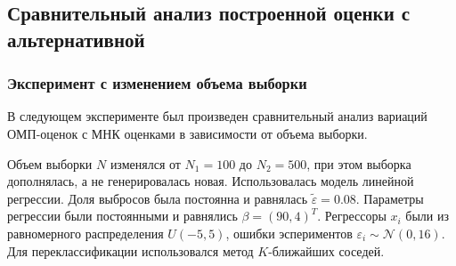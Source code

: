 
\subsection{Сравнительный анализ построенной оценки с альтернативной}
\subsubsection{Эксперимент с изменением объема выборки}
В следующем эксперименте был произведен сравнительный анализ вариаций ОМП-оценок с МНК оценками в зависимости от объема выборки.

Объем выборки $N$ изменялся от $N_1=100$ до $N_2=500$, при этом выборка дополнялась, а не генерировалась новая. Использовалась модель линейной регрессии. Доля выбросов была постоянна и равнялась $\widetilde{\varepsilon}=0.08$. Параметры регрессии были постоянными и равнялись $\beta=(90,4)^T$. 
Регрессоры $x_i$ были из равномерного распределения $U(-5,5)$, ошибки эспериментов $\varepsilon_i\sim \mathcal{N}(0,16)$. Для переклассификации использовался метод $K$-ближайших соседей.

